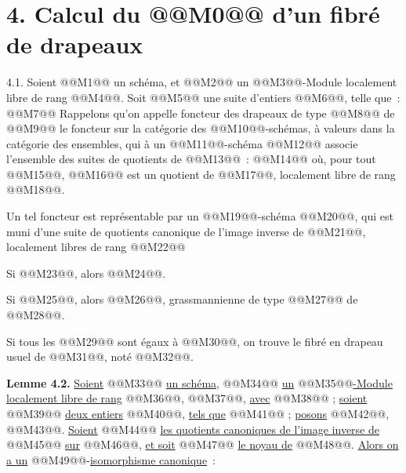 
\section*{4. Calcul du @@M0@@ d'un fibré de drapeaux}

4.1.
Soient @@M1@@ un schéma, et @@M2@@ un @@M3@@-Module localement libre de rang @@M4@@. Soit @@M5@@ une suite d'entiers @@M6@@, telle que~:
@@M7@@
Rappelons qu'on appelle foncteur des drapeaux de type @@M8@@ de @@M9@@ le foncteur sur la catégorie des @@M10@@-schémas, à valeurs dans la catégorie des ensembles, qui à un @@M11@@-schéma @@M12@@ associe l'ensemble des suites de quotients de @@M13@@~:
@@M14@@
où, pour tout @@M15@@, @@M16@@ est un quotient de @@M17@@, localement libre de rang @@M18@@.

Un tel foncteur est représentable par un @@M19@@-schéma @@M20@@, qui est muni d'une suite de quotients canonique de l'image inverse de @@M21@@, localement libres de rang @@M22@@

Si @@M23@@, alors @@M24@@.

Si @@M25@@, alors @@M26@@, grassmannienne de type @@M27@@ de @@M28@@.

Si tous les @@M29@@ sont égaux à @@M30@@, on trouve le fibré en drapeau usuel de @@M31@@, noté @@M32@@.

\textbf{Lemme 4.2.} \uline{Soient} @@M33@@ \uline{un schéma}, @@M34@@ \uline{un} @@M35@@\uline{-Module localement libre de rang} @@M36@@, @@M37@@, \uline{avec} @@M38@@ ; \uline{soient} @@M39@@ \uline{deux entiers} @@M40@@, \uline{tels que} @@M41@@ ; \uline{posons} @@M42@@, @@M43@@. \uline{Soient} @@M44@@ \uline{les quotients canoniques de l'image inverse de} @@M45@@ \uline{sur} @@M46@@, \uline{et soit} @@M47@@ \uline{le noyau de} @@M48@@. \uline{Alors on a un} @@M49@@-\uline{isomorphisme canonique}~:
